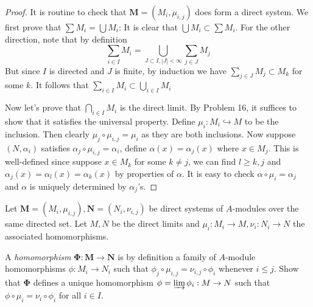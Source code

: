 \documentclass{solution}
\begin{document}
\begin{proof}
    It is routine to check that $\bm{M} = (M_i, \mu_{i, j})$ does form a direct system. We first prove that $\sum M_i = \bigcup M_i$: It is clear that $\bigcup M_i \subset \sum M_i$. For the other direction, note that by definition
    $$\sum\limits_{i \in I} M_i = \bigcup\limits_{J \subset I, \left\lvert J \right\rvert \lt \infty} \sum\limits_{j \in J} M_j$$
    But since $I$ is directed and $J$ is finite, by induction we have $\sum\limits_{j \in J} M_j \subset M_k$ for some $k$. It follows that $\sum\limits_{i \in I} M_i \subset \bigcup\limits_{i \in I} M_i$

    Now let's prove that $\bigcap_{i \in I} M_i$ is the direct limit. By Problem 16, it suffices to show that it satisfies the universal property. Define $\mu_i: M_i \hookrightarrow M$ to be the inclusion. Then clearly $\mu_j \circ \mu_{i, j} = \mu_i$ as they are both inclusions. Now suppose $(N, \alpha_i)$ satisfies $\alpha_j \circ \mu_{i, j} = \alpha_i$, define $\alpha (x) = \alpha_j(x)$ where $x \in M_j$. This is well-defined since suppose $x \in M_k$ for some $k \ne j$, we can find $l \ge k, j$ and $\alpha_j(x) = \alpha_{l}(x) = \alpha_k(x)$ by properties of $\alpha$. It is easy to check $\alpha \circ \mu_i = \alpha_j$ and $\alpha$ is uniquely determined by $\alpha_j$'s.
\end{proof}

\begin{problem}
    Let $\bm{M} = (M_i, \mu_{i, j}), \bm{N} = (N_i, \nu_{i, j})$ be direct systems of $A$-modules over the same directed set. Let $M, N$ be the direct limits and $\mu_i: M_i \rightarrow M, \nu_i: N_i \rightarrow N$ the associated homomorphisms.

    A \textit{homomorphism} $\bm{\Phi}: \bm{M} \rightarrow \bm{N}$ is by definition a family of $A$-module homomorphisms $\phi: M_i \rightarrow N_i$ such that $\phi_j \circ \mu_{i, j} = \nu_{i, j} \circ \phi_i$ whenever $i \le j$. Show that $\bm{\Phi}$ defines a unique homomorphism $\phi = \varinjlim \phi_i: M \rightarrow N$ such that $\phi \circ \mu_i = \nu_i \circ \phi_i$ for all $i \in I$.
\end{problem}
\end{document}
